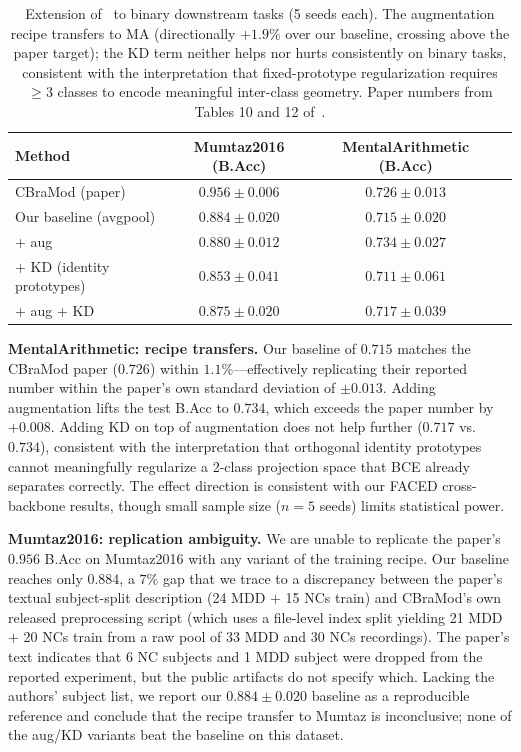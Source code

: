 \begin{table}[!h]
\caption{Extension of \ours\ to binary downstream tasks (5 seeds each). The augmentation recipe transfers to MA (directionally $+1.9\%$ over our baseline, crossing above the paper target); the KD term neither helps nor hurts consistently on binary tasks, consistent with the interpretation that fixed-prototype regularization requires $\geq 3$ classes to encode meaningful inter-class geometry. Paper numbers from Tables 10 and 12 of~\cite{wang2025cbramod}.}
\small
\centering
\begin{tabular}{lccc}
\toprule
Method & Mumtaz2016 (B.Acc) & MentalArithmetic (B.Acc) \\
\midrule
CBraMod (paper) & $0.956 \pm 0.006$ & $0.726 \pm 0.013$ \\
\midrule
Our baseline (avgpool) & $0.884 \pm 0.020$ & $0.715 \pm 0.020$ \\
\quad + aug & $0.880 \pm 0.012$ & $\mathbf{0.734 \pm 0.027}$ \\
\quad + KD (identity prototypes) & $0.853 \pm 0.041$ & $0.711 \pm 0.061$ \\
\quad + aug + KD & $0.875 \pm 0.020$ & $0.717 \pm 0.039$ \\
\bottomrule
\end{tabular}
\label{tab:supp_binary}
\end{table}

\textbf{MentalArithmetic: recipe transfers.} Our baseline of $0.715$ matches the CBraMod paper ($0.726$) within $1.1\%$---effectively replicating their reported number within the paper's own standard deviation of $\pm 0.013$. Adding augmentation lifts the test B.Acc to $\mathbf{0.734}$, which exceeds the paper number by $+0.008$. Adding KD on top of augmentation does not help further (\(0.717\) vs.\ \(0.734\)), consistent with the interpretation that orthogonal identity prototypes cannot meaningfully regularize a 2-class projection space that BCE already separates correctly. The effect direction is consistent with our FACED cross-backbone results, though small sample size ($n = 5$ seeds) limits statistical power.

\textbf{Mumtaz2016: replication ambiguity.} We are unable to replicate the paper's $0.956$ B.Acc on Mumtaz2016 with any variant of the training recipe. Our baseline reaches only $0.884$, a $7\%$ gap that we trace to a discrepancy between the paper's textual subject-split description (24 MDD $+$ 15 NCs train) and CBraMod's own released preprocessing script (which uses a file-level index split yielding 21 MDD $+$ 20 NCs train from a raw pool of 33 MDD and 30 NCs recordings). The paper's text indicates that 6 NC subjects and 1 MDD subject were dropped from the reported experiment, but the public artifacts do not specify which. Lacking the authors' subject list, we report our $0.884 \pm 0.020$ baseline as a reproducible reference and conclude that the recipe transfer to Mumtaz is inconclusive; none of the aug/KD variants beat the baseline on this dataset.

